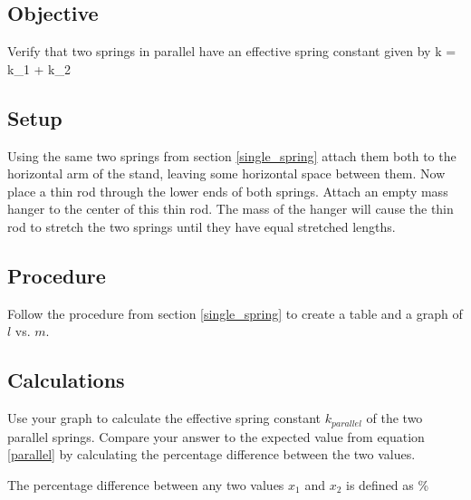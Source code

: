     \subsection*{Objective}

        Verify that two springs in parallel have an effective spring constant given by
        \beq \label{parallel}
            k = k_1 + k_2
        \eeq

    \subsection*{Setup}

        Using the same two springs from section \ref{single_spring} attach them both to the horizontal arm of the stand, leaving some horizontal space between them. Now place a thin rod through the lower ends of both springs. Attach an empty mass hanger to the center of this thin rod. The mass of the hanger will cause the thin rod to stretch the two springs until they have equal stretched lengths.

    \subsection*{Procedure}

        Follow the procedure from section \ref{single_spring} to create a table and a graph of $l$ vs. $m$.

    \subsection*{Calculations}

        Use your graph to calculate the effective spring constant $k_{parallel}$ of the two parallel springs. Compare your answer to the expected value from equation \eqref{parallel} by calculating the percentage difference between the two values.

        The percentage difference between any two values $x_1$ and $x_2$ is defined as
        \beq
              \%
        \eeq
